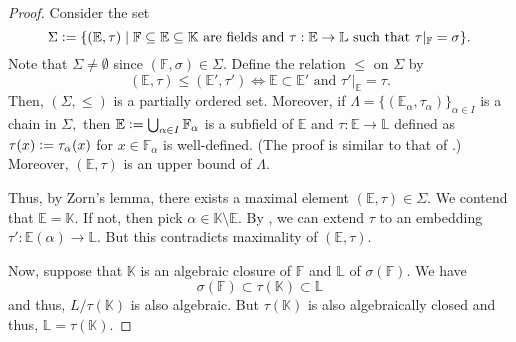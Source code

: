 \extendtoalgextension*\label{thm:extendtoalgextension2}
\begin{flushright}\hyperref[thm:extendtoalgextension]{\upsym}\end{flushright}
\begin{proof}
    Consider the set
    \begin{equation*} 
        \Sigma \vcentcolon= \{(\mathbb{E}, \tau) \mid \mathbb{F} \subset \mathbb{E} \subset \mathbb{K} \text{ are fields and } \tau : \mathbb{E} \to \mathbb{L} \text{ such that }\tau|_{\mathbb{F}} = \sigma\}.
    \end{equation*}
    Note that $\Sigma \neq \emptyset$ since $(\mathbb{F}, \sigma) \in \Sigma.$ Define the relation $\le$ on $\Sigma$ by
    \begin{equation*} 
        (\mathbb{E}, \tau) \le (\mathbb{E}', \tau') \iff \mathbb{E} \subset \mathbb{E}' \text{ and } \tau'|_{\mathbb{E}} = \tau.
    \end{equation*}
    Then, $(\Sigma, \le)$ is a partially ordered set. Moreover, if $\Lambda = \{(\mathbb{E}_\alpha, \tau_\alpha)\}_{\alpha \in I}$ is a chain in $\Sigma,$ then $\mathbb{E} \vcentcolon= \bigcup_{\alpha \in I}\mathbb{F}_\alpha$ is a subfield of $\mathbb{E}$ and $\tau : \mathbb{E} \to \mathbb{L}$ defined as $\tau(x) \vcentcolon= \tau_\alpha(x)$ for $x \in \mathbb{F}_\alpha$ is well-defined. (The proof is similar to that of .) Moreover, $(\mathbb{E}, \tau)$ is an upper bound of $\Lambda.$   

    Thus, by Zorn's lemma, there exists a maximal element $(\mathbb{E}, \tau) \in \Sigma.$ We contend that $\mathbb{E} = \mathbb{K}.$ If not, then pick $\alpha \in \mathbb{K} \setminus \mathbb{E}.$ By , we can extend $\tau$ to an embedding $\tau' : \mathbb{E}(\alpha) \to \mathbb{L}.$ But this contradicts maximality of $(\mathbb{E}, \tau).$

    Now, suppose that $\mathbb{K}$ is an algebraic closure of $\mathbb{F}$ and $\mathbb{L}$ of $\sigma(\mathbb{F}).$ We have
    \begin{equation*} 
        \sigma(\mathbb{F}) \subset \tau(\mathbb{K}) \subset \mathbb{L}
    \end{equation*}
    and thus, $L/\tau(\mathbb{K})$ is also algebraic. But $\tau(\mathbb{K})$ is also algebraically closed and thus, $\mathbb{L} = \tau(\mathbb{K}).$
\end{proof}


